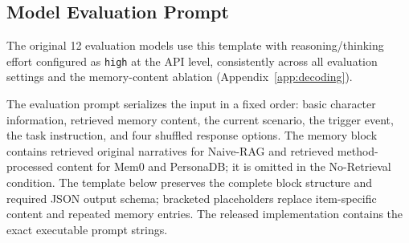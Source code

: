 \documentclass[11pt]{article}
\begin{document}
\subsection{Model Evaluation Prompt}
\label{app:prompt_evaluation}

The original 12 evaluation models use this template with reasoning/thinking effort configured as \texttt{high} at the API level, consistently across all evaluation settings and the memory-content ablation (Appendix~\ref{app:decoding}).

The evaluation prompt serializes the input in a fixed order: basic character information, retrieved memory content, the current scenario, the trigger event, the task instruction, and four shuffled response options. The memory block contains retrieved original narratives for Naive-RAG and retrieved method-processed content for Mem0 and PersonaDB; it is omitted in the No-Retrieval condition. The template below preserves the complete block structure and required JSON output schema; bracketed placeholders replace item-specific content and repeated memory entries. The released implementation contains the exact executable prompt strings.
\end{document}
